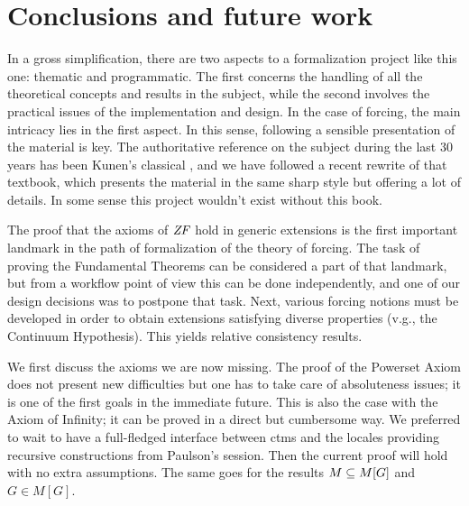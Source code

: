 \section{Conclusions and future work}
\label{sec:conclusions-future-work}

In a gross simplification, there are two aspects to a formalization
project like this one: thematic and programmatic. The first concerns
the handling of all the theoretical concepts and results in the
subject, while the second involves the practical issues of the
implementation and design. In the case of forcing, the main intricacy
lies in the first aspect. In this sense, following a sensible
presentation of the material is key.  The authoritative reference 
on the subject during the last 30 years has been Kunen's classical
\cite{kunen1980}, and  we have followed a recent rewrite
\cite{kunen2011set} 
of that  textbook, which presents the material in the same sharp 
style but offering a lot of details. In some sense this project
wouldn't exist without this book.

The proof that the axioms of $\mathit{ZF}$ hold in generic extensions is 
the first important landmark in the path of formalization of the
theory of forcing. The task of proving the Fundamental Theorems can be
considered a part of that landmark, but from a workflow point of view
this can be done independently, and one of our design decisions was to
postpone that task.  Next, various forcing notions must be developed
in order to obtain extensions satisfying diverse properties (v.g., the
Continuum Hypothesis). This yields relative consistency results.

We first discuss the axioms we are now missing. The proof of the
Powerset Axiom does not present new difficulties but one  has to
take care of absoluteness issues; it is one of the
first goals in the immediate future. This is also the case with the
Axiom of Infinity; it can be proved in a direct but cumbersome way. We
preferred to wait to have a full-fledged interface between ctms and the
locales providing recursive constructions from Paulson's
 session. Then the current proof will hold
with no extra assumptions. The same goes for the results $M\subseteq M[G]$
and $G\in M[G]$.

